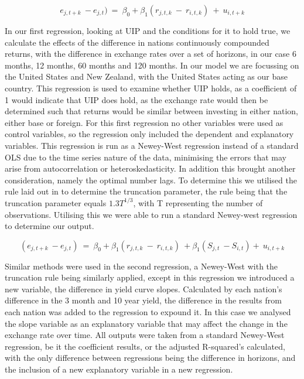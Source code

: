 \documentclass[10pt]{article}
\begin{document}
\begin{equation}
e_{j,t+k}\ -e_{j,t})\ =\ \beta_0+\beta_1(r_{j,t,k}\ -\ r_{i,t,k})\ +\ u_{i,t+k}
\end{equation}

In our first regression, looking at UIP and the conditions for it to hold true, we calculate the effects of the difference in nations continuously compounded returns, with the difference in exchange rates over a set of horizons, in our case 6 months, 12 months, 60 months and 120 months. In our model we are focussing on the United States and New Zealand, with the United States acting as our base country. This regression is used to examine whether UIP holds, as a coefficient of 1 would indicate that UIP does hold, as the exchange rate would then be determined such that returns would be similar between investing in either nation, either base or foreign. For this first regression no other variables were used as control variables, so the regression only included the dependent and explanatory variables. This regression is run as a Newey-West regression instead of a standard OLS due to the time series nature of the data, minimising the errors that may arise from autocorrelation or heteroskedasticity. In addition this brought another consideration, namely the optimal number lags. To determine this we utilised the rule laid out in \cite{lazarus2018har} to determine the truncation parameter, the rule being that the truncation parameter equals $1.3T^{1/3}$, with T representing the number of observations. Utilising this we were able to run a standard Newey-west regression to determine our output.

\begin{equation}
(e_{j,t+k}\ -e_{j,t})\ =\ \beta_0+\beta_1(r_{j,t,k}\ -\ r_{i,t,k})\ +\beta_1(S_{j,t}\ -S_{i,t})+\ u_{i,t+k}
\end{equation}

Similar methods were used in the second regression, a Newey-West with the truncation rule being similarly applied, except in this regression we introduced a new variable, the difference in yield curve slopes. Calculated by each nation's difference in the 3 month and 10 year yield, the difference in the results from each nation was added to the regression to expound it. In this case we analysed the slope variable as an explanatory variable that may affect the change in the exchange rate over time. All outputs were taken from a standard Newey-West regression, be it the coefficient results, or the adjusted R-squared’s calculated, with the only difference between regressions being the difference in horizons, and the inclusion of a new explanatory variable in a new regression.
\end{document}
